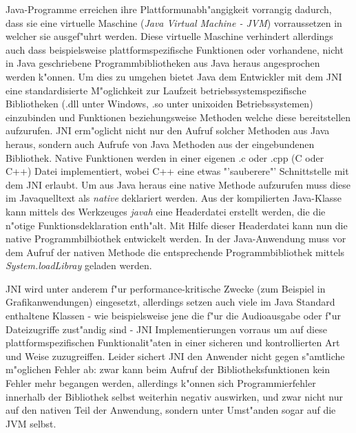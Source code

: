 Java-Programme erreichen ihre Plattformunabh"angigkeit vorrangig dadurch, dass sie eine virtuelle Maschine (\emph{Java Virtual Machine - JVM}) vorraussetzen in welcher sie
ausgef"uhrt werden. Diese virtuelle Maschine verhindert allerdings auch dass beispielsweise plattformspezifische Funktionen oder vorhandene, nicht in Java
geschriebene Programmbibliotheken aus Java heraus angesprochen werden k"onnen.
Um dies zu umgehen bietet Java dem Entwickler mit dem JNI \cite{JNIHP} eine standardisierte M"oglichkeit zur Laufzeit betriebssystemspezifische Bibliotheken 
(.dll unter Windows, .so unter unixoiden Betriebssystemen) einzubinden und Funktionen beziehungsweise Methoden welche diese bereitstellen aufzurufen. 
JNI erm"oglicht nicht nur den Aufruf solcher Methoden aus Java heraus, sondern auch Aufrufe von Java Methoden aus der eingebundenen Bibliothek. 
Native Funktionen werden in einer eigenen .c oder .cpp (C oder C++) Datei implementiert, wobei C++ eine etwas "'sauberere"' Schnittstelle mit dem JNI erlaubt.
Um aus Java heraus eine native Methode aufzurufen muss diese im Javaquelltext als \emph{native} deklariert werden. Aus der kompilierten Java-Klasse kann
mittels des Werkzeuges \emph{javah} eine Headerdatei erstellt werden, die die n"otige Funktionsdeklaration enth"alt. Mit Hilfe dieser Headerdatei kann
nun die native Programmbilbiothek entwickelt werden.
In der Java-Anwendung muss vor dem Aufruf der nativen Methode die entsprechende Programmbibliothek mittels \emph{System.loadLibray} geladen werden.

JNI wird unter anderem f"ur performance-kritische Zwecke (zum Beispiel in Grafikanwendungen) eingesetzt, allerdings setzen auch viele im Java Standard enthaltene
Klassen - wie beispielsweise jene die f"ur die Audioausgabe oder f"ur Dateizugriffe zust"andig sind - JNI Implementierungen vorraus um auf diese
plattformspezifischen Funktionalit"aten in einer sicheren und kontrollierten Art und Weise zuzugreiffen. Leider sichert JNI den Anwender nicht gegen s"amtliche m"oglichen
Fehler ab: zwar kann beim Aufruf der Bibliotheksfunktionen kein Fehler mehr begangen werden, allerdings k"onnen sich Programmierfehler innerhalb der
Bibliothek selbst weiterhin negativ auswirken, und zwar nicht nur auf den nativen Teil der Anwendung, sondern unter Umst"anden sogar auf die JVM selbst.


